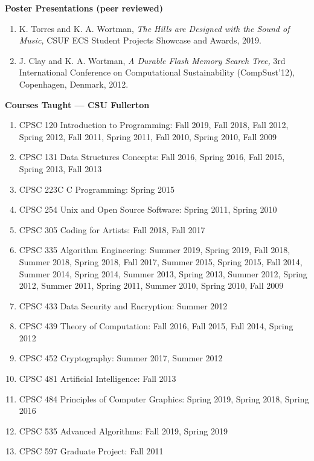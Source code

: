 \documentclass[11pt]{letter}
\begin{document}
\renewcommand{\labelenumi}{P-\arabic{enumi}.}
\textbf{Poster Presentations (peer reviewed)}
\begin{enumerate}
  \item \label{item:hills} K. Torres and K. A. Wortman,
  \emph{The Hills are Designed with the Sound of Music,}
  CSUF ECS Student Projects Showcase and Awards, 2019.
\item \label{item:fmtree} J. Clay and K. A. Wortman, \emph{A Durable Flash Memory Search Tree,} 3rd International Conference on Computational Sustainability (CompSust'12), Copenhagen, Denmark, 2012.
\end{enumerate}

\renewcommand{\labelenumi}{\arabic{enumi}.}


\textbf{Courses Taught --- CSU Fullerton}
\begin{enumerate}
\item CPSC 120 Introduction to Programming: Fall 2019, Fall 2018, Fall 2012,  Spring 2012, Fall 2011, Spring 2011, Fall 2010, Spring 2010, Fall 2009
\item CPSC 131 Data Structures Concepts: Fall 2016, Spring 2016, Fall 2015, Spring 2013, Fall 2013
\item CPSC 223C C Programming: Spring 2015
\item CPSC 254 Unix and Open Source Software: Spring 2011, Spring 2010
\item CPSC 305 Coding for Artists: Fall 2018, Fall 2017
\item CPSC 335 Algorithm Engineering: Summer 2019, Spring 2019, Fall 2018, Summer 2018, Spring 2018, Fall 2017, Summer 2015, Spring 2015, Fall 2014, Summer 2014, Spring 2014, Summer 2013, Spring 2013, Summer 2012, Spring 2012, Summer 2011, Spring 2011, Summer 2010, Spring 2010, Fall 2009
\item CPSC 433 Data Security and Encryption: Summer 2012
\item CPSC 439 Theory of Computation: Fall 2016, Fall 2015, Fall 2014, Spring 2012
\item CPSC 452 Cryptography: Summer 2017, Summer 2012
\item CPSC 481 Artificial Intelligence: Fall 2013
\item CPSC 484 Principles of Computer Graphics: Spring 2019, Spring 2018, Spring 2016
\item CPSC 535 Advanced Algorithms: Fall 2019, Spring 2019
\item CPSC 597 Graduate Project: Fall 2011
\end{enumerate}
\end{document}

